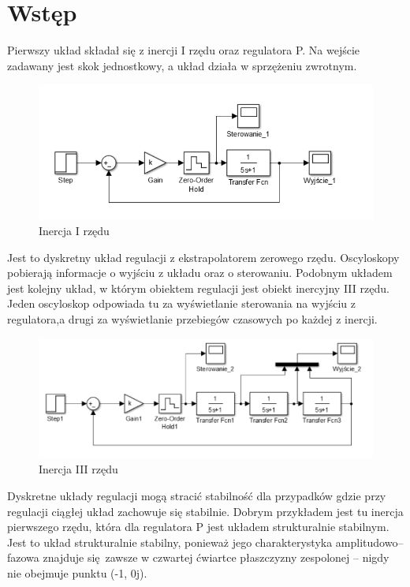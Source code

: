 \documentclass[a4paper, 12pt]{article}
\begin{document}
	\section{Wstęp}
		Pierwszy układ składał się z inercji I rzędu oraz regulatora P. Na wejście zadawany jest skok jednostkowy, a układ działa w sprzężeniu zwrotnym.
		\begin{figure}[H]
			\centering
			\includegraphics[width = \textwidth]{./img/uklad1.png}
			\caption{Inercja I rzędu}
		\end{figure}
		\noindent Jest to dyskretny układ regulacji z ekstrapolatorem zerowego rzędu. Oscyloskopy pobierają informacje o wyjściu z układu oraz o sterowaniu.
		\newline \newline
		Podobnym układem jest kolejny układ, w którym obiektem regulacji jest obiekt inercyjny III rzędu. Jeden oscyloskop odpowiada tu za wyświetlanie sterowania na wyjściu z regulatora,\linebreak a drugi za wyświetlanie przebiegów czasowych po każdej z inercji.
		\begin{figure}[H]
			\centering
			\includegraphics[width = \textwidth]{./img/uklad2.png}
			\caption{Inercja III rzędu}
		\end{figure}
		\noindent Dyskretne układy regulacji mogą stracić stabilność dla przypadków gdzie przy regulacji ciągłej układ zachowuje się stabilnie. Dobrym przykładem jest tu inercja pierwszego rzędu, która dla regulatora P jest układem strukturalnie stabilnym. Jest to układ strukturalnie stabilny, ponieważ jego charakterystyka amplitudowo--fazowa znajduje się zawsze w czwartej ćwiartce płaszczyzny zespolonej -- nigdy nie obejmuje punktu (-1, 0j).
\end{document}
